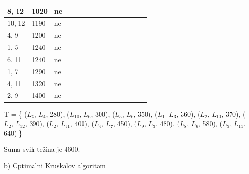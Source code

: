 \documentclass[12pt]{article}
\begin{document}
\begin{table}[hp]
\begin{tabular}{|l|l|l|l|l|l|l|l|l|l|l|l|l|l|l|}
8, 12  & 1020   & ne    &    &    &    &    &    &    &    &    &    &     &     &     \\ \hline
10, 12 & 1190   & ne    &    &    &    &    &    &    &    &    &    &     &     &     \\ \hline
4, 9   & 1200   & ne    &    &    &    &    &    &    &    &    &    &     &     &     \\ \hline
1, 5   & 1240   & ne    &    &    &    &    &    &    &    &    &    &     &     &     \\ \hline
6, 11  & 1240   & ne    &    &    &    &    &    &    &    &    &    &     &     &     \\ \hline
1, 7   & 1290   & ne    &    &    &    &    &    &    &    &    &    &     &     &     \\ \hline
4, 11  & 1320   & ne    &    &    &    &    &    &    &    &    &    &     &     &     \\ \hline
2, 9   & 1400   & ne    &    &    &    &    &    &    &    &    &    &     &     &     \\ \hline
\end{tabular}
\end{table}
T =  \{ (\(L_{3}\), \(L_{4}\), 280), (\(L_{10}\), \(L_{6}\), 300), (\(L_{5}\), \(L_{6}\), 350), (\(L_{1}\), \(L_{3}\), 360), (\(L_{2}\), \(L_{10}\), 370), (\(L_{2}\), \(L_{12}\), 390), (\(L_{2}\), \(L_{11}\), 400), (\(L_{4}\), \(L_{7}\), 450), (\(L_{9}\), \(L_{3}\), 480), (\(L_{8}\), \(L_{6}\), 580), (\(L_{3}\), \(L_{11}\), 640) \}

Suma svih težina je 4600.


\newpage
b) Optimalni Kruskalov algoritam
\end{document}
